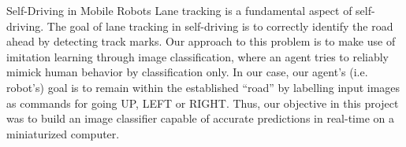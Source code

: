 \documentclass[final,hyperref={pdfpagelabels=false},notheorems]{beamer}
\theoremstyle{thesisstyle}
\begin{document}
\begin{frame}[t]
\begin{columns}[t]
\begin{column}{.5225\textwidth}
    \begin{block}{Self-Driving in Mobile Robots}
      Lane tracking is a fundamental aspect of self-driving. The goal of lane tracking in
      self-driving is to correctly identify the road ahead by detecting track marks. Our approach
      to this problem is to make use of imitation learning through image classification, where an
      agent tries to reliably mimick human behavior by classification only. In our case, our
      agent's (i.e. robot's) goal is to remain within the established ``road'' by labelling input
      images as commands for going UP, LEFT or RIGHT. Thus, our objective in this project was to
      build an image classifier capable of accurate predictions in real-time on a miniaturized
      computer.\\~\\


\end{block}
\end{column}
\end{columns}
\end{frame}
\end{document}
